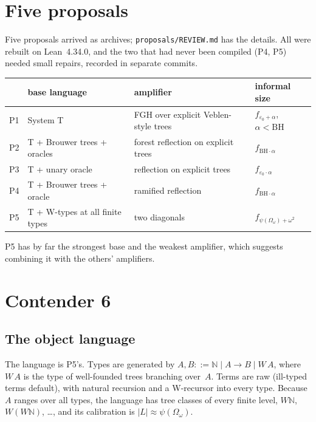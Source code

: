 \documentclass[11pt]{article}
\theoremstyle{definition}
\theoremstyle{remark}
\newcommand{\N}{\mathbb{N}}
\newcommand{\lean}[1]{\texttt{#1}}
\newcommand{\BH}{\ensuremath{\mathrm{BH}}}
\begin{document}
\section{Five proposals}

Five proposals arrived as archives; \lean{proposals/REVIEW.md} has the details.
All were rebuilt on Lean~4.34.0, and the two that had never been compiled (P4,
P5) needed small repairs, recorded in separate commits.

\begin{center}
\begin{tabular}{llll}
\toprule
& base language & amplifier & informal size\\
\midrule
P1 & System T & FGH over explicit Veblen-style trees & $f_{\varepsilon_0+\alpha}$, $\alpha<\BH$\\
P2 & T + Brouwer trees + oracles & forest reflection on explicit trees & $f_{\BH\cdot\alpha}$\\
P3 & T + unary oracle & reflection on explicit trees & $f_{\varepsilon_0\cdot\alpha}$\\
P4 & T + Brouwer trees + oracle & ramified reflection & $f_{\BH\cdot\alpha}$\\
P5 & T + W-types at all finite types & two diagonals & $f_{\psi(\Omega_\omega)+\omega^2}$\\
\bottomrule
\end{tabular}
\end{center}

P5 has by far the strongest base and the weakest amplifier, which suggests
combining it with the others' amplifiers.

\section{Contender 6}

\subsection{The object language}
The language is P5's. Types are generated by $A,B::=\N\mid A\to B\mid W\,A$,
where $W\,A$ is the type of well-founded trees branching over~$A$. Terms are raw
(ill-typed terms default), with natural recursion and a W-recursor into every
type. Because $A$ ranges over all types, the language has tree classes of
every finite level, $W\N$, $W(W\N)$, \dots, and its calibration is
$|L|\approx\psi(\Omega_\omega)$.
\end{document}
